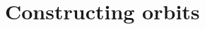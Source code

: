 \documentclass[aspectratio=169]{beamer}
\makeatletter
\let\beamer@original@frame=\frame
\def\frame{\gdef\insertfootlineextra{}\beamer@original@frame}
\def\tikzoverlay{%
   \tikz[baseline,overlay]\node[every overlay node]
}%
\makeatother
\begin{document}


\section{Constructing orbits}%
\end{document}
